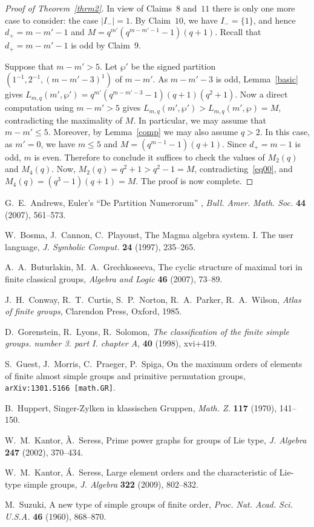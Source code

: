 \documentclass{amsart}
\begin{document}
\begin{proof}[Proof of Theorem~\ref{thrm2}]
\smallskip

In view of Claims~$8$ and~$11$ there is only one more case to consider: the case $|I_-|=1$. By Claim~$10$, we have $I_-=\{1\}$, and hence $d_+=m-m'-1$ and $M=q^{m'}(q^{m-m'-1}-1)(q+1)$. Recall that $d_+=m-m'-1$ is odd by Claim~$9$. 

Suppose that $m-m'>5$. Let $\wp'$ be the signed partition $(1^{-1},2^{-1},(m-m'-3)^{1})$ of $m-m'$. As $m-m'-3$ is odd, Lemma~\ref{basic} gives $L_{m,q}(m',\wp')=q^{m'}(q^{m-m'-3}-1)(q+1)(q^2+1)$. Now a direct computation using $m-m'>5$ gives $L_{m,q}(m',\wp')>L_{m,q}(m',\wp)=M$, contradicting the maximality of $M$. In particular, we may assume that $m-m'\leq 5$. Moreover, by Lemma~\ref{comp} we may also assume $q>2$. In this case, as $m'=0$, we have $m\leq 5$ and $M=(q^{m-1}-1)(q+1)$. Since $d_+=m-1$ is odd, $m$ is even. Therefore to conclude it suffices to check the values of $M_2(q)$ and $M_4(q)$. Now, $M_2(q)=q^2+1>q^2-1=M$, contradicting~\eqref{eq00}, and $M_4(q)=(q^3-1)(q+1)=M$. The proof is now complete.
\end{proof}

G.~E.~Andrews, Euler's ``De Partition Numerorum'' , \textit{Bull. Amer. Math. Soc. }\textbf{44} (2007), 561--573.

W.~Bosma, J.~Cannon, C.~Playoust, The Magma algebra system. I. The user language, \textit{J.
Symbolic Comput.} \textbf{24} (1997), 235--265.

A.~A.~Buturlakin, M.~A.~Grechkoseeva, The cyclic structure
  of maximal tori in finite classical groups, \textit{Algebra and
    Logic} \textbf{46} (2007), 73--89.

J.~H.~Conway, R.~T.~Curtis, S.~P.~Norton, R.~A.~Parker,
  R.~A.~Wilson, \textit{Atlas of finite groups}, Clarendon Press, Oxford, 1985.

D.~Gorenstein, R.~Lyons, R.~Solomon, \emph{The classification
  of the finite simple groups. number 3. part I. chapter A},  \textbf{40}
  (1998), xvi+419.

S.~Guest, J.~Morris, C.~Praeger, P.~Spiga, On the maximum orders of elements of finite almost simple groups and primitive permutation groups, {\tt 	arXiv:1301.5166 [math.GR]}.

B.~Huppert, Singer-Zylken in klassischen Gruppen, \textit{Math. Z.} \textbf{117} (1970), 141--150.

W.~M.~Kantor, \`{A}.~Seress, Prime power graphs for
  groups of Lie type, \textit{J. Algebra} \textbf{247} (2002),
  370--434. 

W.~M.~Kantor, \'{A}.~Seress, Large element orders and the
  characteristic of Lie-type simple groups, \textit{J. Algebra}
  \textbf{322} (2009), 802--832.

M.~Suzuki, A new type of simple groups of finite
  order, \textit{Proc. Nat. Acad. Sci. U.S.A.} \textbf{46} (1960), 868--870.  
\end{document}
